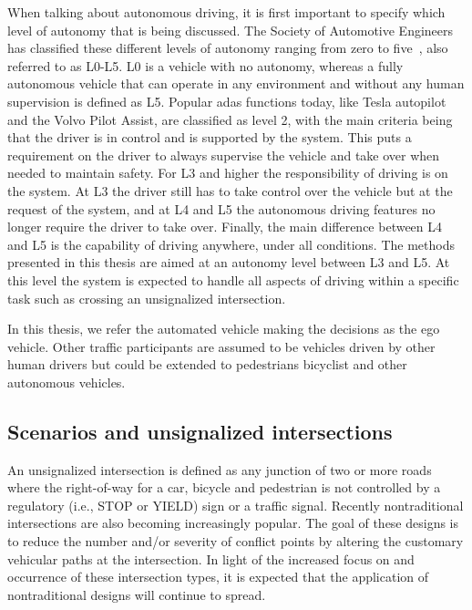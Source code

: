 When talking about autonomous driving, it is first important to specify which level of autonomy that is being discussed. The Society of Automotive Engineers has classified these different levels of autonomy ranging from zero to five~\cite{SAE2021}, also referred to as L0-L5. L0 is a vehicle with no autonomy, whereas a fully autonomous vehicle that can operate in any environment and without any human supervision is defined as L5. Popular \gls{adas} functions today, like Tesla autopilot and the Volvo Pilot Assist, are classified as level 2, with the main criteria being that the driver is in control and is supported by the system. This puts a requirement on the driver to always supervise the vehicle and take over when needed to maintain safety. For L3 and higher the responsibility of driving is on the system. At L3 the driver still has to take control over the vehicle but at the request of the system, and at L4 and L5 the autonomous driving features no longer require the driver to take over. Finally, the main difference between L4 and L5 is the capability of driving anywhere, under all conditions. 
The methods presented in this thesis are aimed at an autonomy level between L3 and L5. At this level the system is expected to handle all aspects of driving within a specific task such as crossing an unsignalized intersection. 

In this thesis, we refer the automated vehicle making the decisions as the ego vehicle.
Other traffic participants are assumed to be vehicles driven by other human drivers but could be extended to pedestrians bicyclist and other autonomous vehicles. 


\subsection{Scenarios and unsignalized intersections}
An unsignalized intersection is defined as any junction of two or more roads where the right-of-way for a car, bicycle and pedestrian is not controlled by a regulatory (i.e., STOP or YIELD) sign or a traffic signal.
Recently nontraditional intersections are also becoming increasingly popular. The goal of these designs is to reduce the number and/or severity of conflict points by altering the customary vehicular paths at the intersection. In light of the increased focus on and occurrence of these intersection types, it is expected that the application of nontraditional designs will continue to spread.

